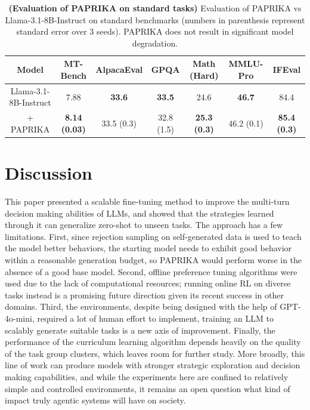 \documentclass[manuscript,review]{acmart}
\begin{document}
{%
\begin{table}[t]
    \centering
    \caption{\textbf{(Evaluation of \textsc{PAPRIKA} on standard tasks)} Evaluation of
    \textsc{PAPRIKA} vs Llama-3.1-8B-Instruct on standard benchmarks (numbers in
    parenthesis represent standard error over 3 seeds). \textsc{PAPRIKA} does not result
    in significant model degradation.}
    \label{tab:mt_bench_eval}
    \begin{tabular}{c|cccccc}
        \toprule
        Model & MT-Bench & AlpacaEval & GPQA & Math (Hard) & MMLU-Pro & IFEval \\
        \midrule
         Llama-3.1-8B-Instruct  & 7.88                  & \textbf{33.6} & \textbf{33.5} & 24.6                  & \textbf{46.7} & 84.4\\
         + \textsc{PAPRIKA}     & \textbf{8.14 (0.03)}  & 33.5 (0.3)    & 32.8 (1.5)    & \textbf{25.3 (0.3)}   & 46.2 (0.1)    & \textbf{85.4 (0.3)} \\
         \bottomrule
    \end{tabular}
\end{table}
}
\section{Discussion}
{
This paper presented a scalable fine-tuning method to improve the multi-turn decision
making abilities of LLMs, and showed that the strategies learned through it can
generalize zero-shot to unseen tasks. The approach has a few limitations. First, since
rejection sampling on self-generated data is used to teach the model better behaviors,
the starting model needs to exhibit good behavior within a reasonable generation budget,
so \textsc{PAPRIKA} would perform worse in the absence of a good base model. Second,
offline preference tuning algorithms were used due to the lack of computational
resources; running online RL on diverse tasks instead is a promising future direction
given its recent success in other
domains\cite{deepseekai2025deepseekr1incentivizingreasoningcapability}. Third, the
environments, despite being designed with the help of GPT-4o-mini, required a lot of
human effort to implement, training an LLM to scalably generate suitable tasks is a
new axis of improvement. Finally, the performance of the curriculum learning algorithm
depends heavily on the quality of the task group clusters, which leaves room for further
study. More broadly, this line of work can produce models with stronger strategic
exploration and decision making capabilities, and while the experiments here are
confined to relatively simple and controlled environments, it remains an open question
what kind of impact truly agentic systems will have on society.
}



\end{document}
